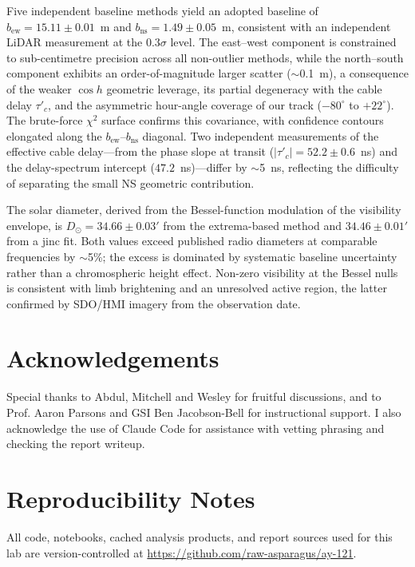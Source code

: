 \documentclass[10pt,preprint2]{aastex}
\begin{document}
Five independent baseline methods yield an adopted baseline of $b_{\mathrm{ew}} = 15.11 \pm 0.01$~m and $b_{\mathrm{ns}} = 1.49 \pm 0.05$~m, consistent with an independent LiDAR measurement at the $0.3\sigma$ level. The east--west component is constrained to sub-centimetre precision across all non-outlier methods, while the north--south component exhibits an order-of-magnitude larger scatter ($\sim$0.1~m), a consequence of the weaker $\cos h$ geometric leverage, its partial degeneracy with the cable delay $\tau'_c$, and the asymmetric hour-angle coverage of our track ($-80^\circ$ to $+22^\circ$). The brute-force $\chi^2$ surface confirms this covariance, with confidence contours elongated along the $b_{\mathrm{ew}}$--$b_{\mathrm{ns}}$ diagonal. Two independent measurements of the effective cable delay---from the phase slope at transit ($|\tau'_c| = 52.2 \pm 0.6$~ns) and the delay-spectrum intercept ($47.2$~ns)---differ by $\sim$5~ns, reflecting the difficulty of separating the small NS geometric contribution.

The solar diameter, derived from the Bessel-function modulation of the visibility envelope, is $D_\odot = 34.66 \pm 0.03'$ from the extrema-based method and $34.46 \pm 0.01'$ from a jinc fit. Both values exceed published radio diameters at comparable frequencies by $\sim$5\%; the excess is dominated by systematic baseline uncertainty rather than a chromospheric height effect. Non-zero visibility at the Bessel nulls is consistent with limb brightening and an unresolved active region, the latter confirmed by SDO/HMI imagery from the observation date.

\section*{Acknowledgements}
Special thanks to Abdul, Mitchell and Wesley for fruitful discussions,
and to Prof. Aaron Parsons and GSI Ben Jacobson-Bell for instructional support.
I also acknowledge the use of Claude Code for assistance
with vetting phrasing and checking the report writeup.




\appendix

\section{Reproducibility Notes}
\label{sec:app_reproducibility}

All code, notebooks, cached analysis products, and report sources used for
this lab are version-controlled at
\url{https://github.com/raw-asparagus/ay-121}. 
\end{document}
